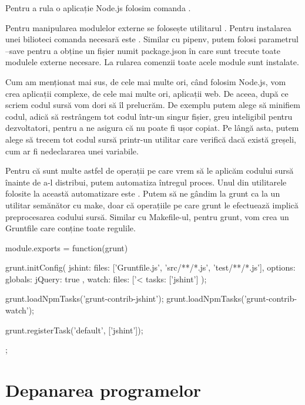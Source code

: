Pentru a rula o aplicație Node.js folosim comanda .

Pentru manipularea modulelor externe se folosește utilitarul . Pentru
instalarea unei bilioteci comanda necesară este .
Similar cu pipenv, putem folosi parametrul --save pentru a obține un fișier
numit package.json în care sunt trecute toate modulele externe necesare. La
rularea comenzii  toate acele module sunt instalate.

Cum am menționat mai sus, de cele mai multe ori, când folosim Node.js, vom crea
aplicații complexe, de cele mai multe ori, aplicații web. De aceea, după ce
scriem codul sursă vom dori să îl prelucrăm. De exemplu putem alege să minifiem
codul, adică să restrângem tot codul într-un singur fișier, greu inteligibil
pentru dezvoltatori, pentru a ne asigura că nu poate fi ușor copiat. Pe lângă
asta, putem alege să trecem tot codul sursă printr-un utilitar care verifică
dacă există greșeli, cum ar fi nedeclararea unei variabile.

Pentru că sunt multe astfel de operații pe care vrem să le aplicăm codului sursă
înainte de a-l distribui, putem automatiza întregul proces. Unul din utilitarele
folosite la această automatizare este . Putem să ne gândim la grunt
ca la un utilitar semănător cu make, doar că operațiile pe care grunt le
efectuează implică preprocesarea codului sursă. Similar cu Makefile-ul, pentru
grunt, vom crea un Gruntfile care conține toate regulile.

\begin{screen}[caption={Exemplu cod Gruntfile}]
module.exports = function(grunt) {

 grunt.initConfig({
   jshint: {
     files: ['Gruntfile.js', 'src/**/*.js', 'test/**/*.js'],
     options: {
       globals: {
         jQuery: true
       }
     }
   },
   watch: {
     files: ['<%
     tasks: ['jshint']
   }
 });

 grunt.loadNpmTasks('grunt-contrib-jshint');
 grunt.loadNpmTasks('grunt-contrib-watch');

 grunt.registerTask('default', ['jshint']);

};
\end{screen}

\section{Depanarea programelor}
\label{sec:appdev-debugging}

